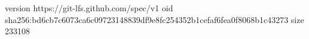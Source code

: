version https://git-lfs.github.com/spec/v1
oid sha256:bd6cb7c6073ca6c09723148839df9e8fc254352b1cefaf6fea0f8068b1c43273
size 233108
